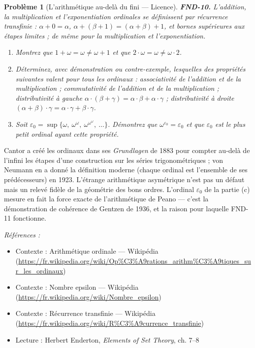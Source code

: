 \documentclass[11pt]{article}
\newtheorem{problem}{Problème}
\newenvironment{refs}{\par\small\noindent\emph{Références :}\begin{itemize}\setlength\itemsep{0pt}}{\end{itemize}\normalsize}
\begin{document}
\begin{problem}[{L'arithmétique au-delà du fini --- Licence}]
\textbf{FND-10.} L'addition, la multiplication et l'exponentiation ordinales se
définissent par récurrence transfinie : $ \alpha + 0 = \alpha $,
$ \alpha + (\beta+1) = (\alpha+\beta) + 1 $, et bornes supérieures aux étapes limites ; de
même pour la multiplication et l'exponentiation.
\begin{enumerate}
\item[(a)] Montrez que $ 1 + \omega = \omega \ne \omega + 1 $ et
que $ 2 \cdot \omega = \omega \ne \omega \cdot 2 $.
\item[(b)] Déterminez, avec démonstration ou
contre-exemple, lesquelles des propriétés suivantes valent pour tous les ordinaux : associativité
de l'addition et de la multiplication ; commutativité de l'addition et de la multiplication ;
distributivité à gauche
$ \alpha \cdot (\beta + \gamma) = \alpha\cdot\beta + \alpha\cdot\gamma $ ; distributivité à
droite $ (\alpha + \beta) \cdot \gamma = \alpha\cdot\gamma + \beta\cdot\gamma $.
\item[(c)] Soit $ \varepsilon_0 = \sup\{\omega,\ \omega^{\omega},\ \omega^{\omega^{\omega}},\
\ldots\} $. Démontrez que $ \omega^{\varepsilon_0} = \varepsilon_0 $ et que
$ \varepsilon_0 $ est le plus petit ordinal ayant cette propriété.
\end{enumerate}

\end{problem}

\noindent Cantor a créé les ordinaux dans ses \textit{Grundlagen} de 1883 pour compter
\og{} au-delà de l'infini \fg{} les étapes d'une construction sur les séries trigonométriques ; von
Neumann en a donné la définition moderne (chaque ordinal est l'ensemble de ses prédécesseurs) en
1923. L'étrange arithmétique asymétrique n'est pas un défaut mais un relevé fidèle de la géométrie
des bons ordres. L'ordinal $ \varepsilon_0 $ de la partie (c) mesure en fait la force exacte de
l'arithmétique de Peano --- c'est la démonstration de cohérence de Gentzen de 1936, et la raison
pour laquelle FND-11 fonctionne.

\begin{refs}
\item Contexte : Arithmétique ordinale --- Wikipédia (\url{https://fr.wikipedia.org/wiki/Op%C3%A9rations_arithm%C3%A9tiques_sur_les_ordinaux})
\item Contexte : Nombre epsilon --- Wikipédia (\url{https://fr.wikipedia.org/wiki/Nombre_epsilon})
\item Contexte : Récurrence transfinie --- Wikipédia (\url{https://fr.wikipedia.org/wiki/R%C3%A9currence_transfinie})
\item Lecture : Herbert Enderton, \textit{Elements of Set Theory}, ch. 7--8
\end{refs}
\end{document}
